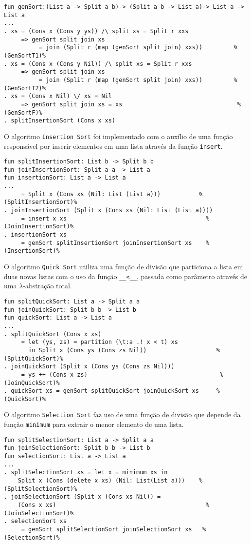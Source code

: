 \begin{Verbatim}
fun genSort:(List a -> Split a b)-> (Split a b -> List a)-> List a -> List a
...
. xs = (Cons x (Cons y ys)) /\ split xs = Split r xxs 
     => genSort split join xs
          = join (Split r (map (genSort split join) xxs))         %(GenSortT1)%
. xs = (Cons x (Cons y Nil)) /\ split xs = Split r xxs 
     => genSort split join xs 
          = join (Split r (map (genSort split join) xxs))         %(GenSortT2)%
. xs = (Cons x Nil) \/ xs = Nil
     => genSort split join xs = xs                                 %(GenSortF)%
. splitInsertionSort (Cons x xs) 
\end{Verbatim}

O algoritmo \Verb.Insertion Sort. foi implementado com o auxílio de uma função responsável por inserir elementos em uma lista através da função \Verb.insert..

\begin{Verbatim}
fun splitInsertionSort: List b -> Split b b
fun joinInsertionSort: Split a a -> List a
fun insertionSort: List a -> List a
...
     = Split x (Cons xs (Nil: List (List a)))           %(SplitInsertionSort)%
. joinInsertionSort (Split x (Cons xs (Nil: List (List a)))) 
     = insert x xs                                        %(JoinInsertionSort)%
. insertionSort xs 
     = genSort splitInsertionSort joinInsertionSort xs    %(InsertionSort)%
\end{Verbatim}

O algoritmo \Verb.Quick Sort. utiliza uma função de divisão que particiona a lista em duas novas listas com o uso da função \Verb.__<__., passada como parâmetro através de uma $\lambda$-abstração total.

\begin{Verbatim}
fun splitQuickSort: List a -> Split a a
fun joinQuickSort: Split b b -> List b
fun quickSort: List a -> List a
...
. splitQuickSort (Cons x xs) 
     = let (ys, zs) = partition (\t:a .! x < t) xs
       in Split x (Cons ys (Cons zs Nil))                    %(SplitQuickSort)%
. joinQuickSort (Split x (Cons ys (Cons zs Nil))) 
     = ys ++ (Cons x zs)                                      %(JoinQuickSort)%
. quickSort xs = genSort splitQuickSort joinQuickSort xs     %(QuickSort)%
\end{Verbatim}

O algoritmo \Verb.Selection Sort. faz uso de uma função de divisão que depende da função \Verb.minimum. para extrair o menor elemento de uma lista.

\begin{Verbatim}
fun splitSelectionSort: List a -> Split a a
fun joinSelectionSort: Split b b -> List b
fun selectionSort: List a -> List a
...
. splitSelectionSort xs = let x = minimum xs in
	Split x (Cons (delete x xs) (Nil: List(List a)))    %(SplitSelectionSort)%
. joinSelectionSort (Split x (Cons xs Nil)) =
 	(Cons x xs)                                           %(JoinSelectionSort)%
. selectionSort xs
     = genSort splitSelectionSort joinSelectionSort xs   %(SelectionSort)%
\end{Verbatim}

